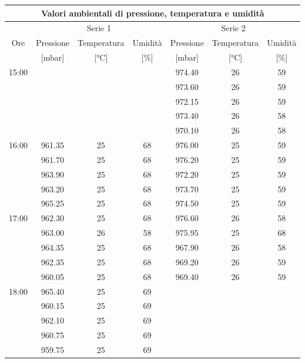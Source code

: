 \begin{SCtable}[][p]
    \footnotesize
    \begin{tabular}{c | c c c | c c c}
	    \multicolumn{7}{c}{\textbf{Valori ambientali di pressione, temperatura e umidità}} \\
        \toprule
        \multicolumn{1}{c}{} & \multicolumn{3}{c}{Serie 1} & \multicolumn{3}{c}{Serie 2} \\
        Ore & Pressione & Temperatura & Umidità & Pressione & Temperatura & Umidità \\
         & [\si{\milli\bar}] & [\si{\celsius}] & [\%] & [\si{\milli\bar}] & [\si{\celsius}] & [\%] \\
        \midrule
        \multirow{5}{*}{15:00} & $\,$ & $\,$ & $\,$ & 974.40 & 26 & 59 \\
         & $\,$ & $\,$ & $\,$ & 973.60 & 26 & 59 \\
         & $\,$ & $\,$ & $\,$ & 972.15 & 26 & 59 \\
         & $\,$ & $\,$ & $\,$ & 973.40 & 26 & 58 \\
         & $\,$ & $\,$ & $\,$ & 970.10 & 26 & 58 \\
        \midrule
        \multirow{5}{*}{16:00} & 961.35 & 25 & 68 & 976.00 & 25 & 59 \\
         & 961.70 & 25 & 68 & 976.20 & 25 & 59 \\
         & 963.90 & 25 & 68 & 972.20 & 25 & 59 \\
         & 963.20 & 25 & 68 & 973.70 & 25 & 59 \\
         & 965.25 & 25 & 68 & 974.50 & 25 & 59 \\
        \midrule
        \multirow{5}{*}{17:00} & 962.30 & 25 & 68 & 976.60 & 26 & 58 \\
         & 963.00 & 26 & 58 & 975.95 & 25 & 68 \\
         & 964.35 & 25 & 68 & 967.90 & 26 & 58\\
         & 962.35 & 25 & 68 & 969.20 & 26 & 59\\
         & 960.05 & 25 & 68 & 969.40 & 26 & 59 \\
        \midrule
        \multirow{5}{*}{18:00} & 965.40 & 25 & 69 & $\,$ & $\,$ & $\,$ \\
         & 960.15 & 25 & 69 & $\,$ & $\,$ & $\,$ \\
         & 962.10 & 25 & 69 & $\,$ & $\,$ & $\,$ \\
         & 960.75 & 25 & 69 & $\,$ & $\,$ & $\,$ \\
         & 959.75 & 25 & 69 & $\,$ & $\,$ & $\,$ \\
        \bottomrule
    \end{tabular}



\end{SCtable}
